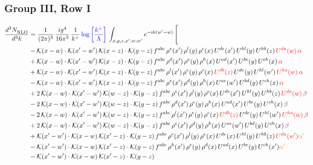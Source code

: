 \documentclass[9pt]{article}
\numberwithin{equation}{section}
\begin{document}
\subsubsection{Group III, Row I}
\begin{align}
     \frac{d^{3}N_{\rm NLO}^{\rm}}{d^{3}k}  & = \frac{1}{(2\pi)^{3}}\, \frac{ig^{4}}{16\pi^{5}}\, \frac{1}{k^{+}}\, {\color{blue}\log{\left[\frac{k^{+}}{\Lambda}\right]}}\, \int_{x,y,z,x^{\prime},w,w^{\prime}}e^{-ik(w^{\prime}-w)}\, \Bigg[\notag \\ & -\mathcal{K}(x-w)\cdot \mathcal{K}(x'-w')\, \mathcal{K}(x-z)\cdot \mathcal{K}(y-z)\, f^{abc}\, \rho^{e}(x')\,\rho^{l}(y)\,\rho^{c}(x)\,U^{de}(x')\,U^{hl}(y)\,U^{hb}(z)\,{\color{red}U^{da}(w)}\, {\color{red}\alpha} \notag \\ & +\mathcal{K}(x-w)\cdot \mathcal{K}(x'-w')\, \mathcal{K}(x-z)\cdot \mathcal{K}(y-z)\, f^{abc}\, \rho^{d}(x')\,\rho^{e}(y)\,\rho^{h}(x)\,U^{ad}(x')\,U^{be}(y)\,U^{ch}(x)\, {\color{red}\alpha} \notag \\ & + \mathcal{K}(x-w)\cdot \mathcal{K}(x'-w')\, \mathcal{K}(x-z)\cdot \mathcal{K}(y-z)\, f^{abc}\, \rho^{l}(x')\,\rho^{e}(y)\,\rho^{c}(x)\,{\color{red}U^{db}(z)}\,U^{de}(y)\,U^{hl}(w')\,{\color{red}U^{ha}(w)}\, {\color{red}\alpha} \notag \\ & -\mathcal{K}(x-w)\cdot \mathcal{K}(x'-w')\, \mathcal{K}(x-z)\cdot \mathcal{K}(y-z)\, f^{abc}\, \rho^{e}(x')\,\rho^{d}(y)\,\rho^{h}(x)\,U^{ae}(w')\,U^{bd}(y)\,U^{ch}(x)\, {\color{red}\alpha} \notag \\ & +2\, \mathcal{K}(x-w)\cdot \mathcal{K}(x'-w')\, \mathcal{K}(w-z) \cdot \mathcal{K}(y-z)\, f^{abc}\, \rho^{e}(x')\,\rho^{l}(y)\, \rho^{c}(x)\, U^{de}(x')\,U^{hl}(y)\,U^{hb}(z)\,{\color{red}U^{da}(w)}\, {\color{violet} \beta} \notag \\ & -2\, \mathcal{K}(x-w)\cdot \mathcal{K}(x'-w')\, \mathcal{K}(w-z) \cdot \mathcal{K}(y-z)\, f^{abc}\, \rho^{d}(x')\,\rho^{e}(y)\, \rho^{h}(x)\, U^{ad}(x')\,U^{be}(y)\,U^{ch}(x)\, {\color{violet} \beta}\notag \\ & -2\, \mathcal{K}(x-w)\cdot \mathcal{K}(x'-w')\, \mathcal{K}(w-z) \cdot \mathcal{K}(y-z)\, f^{abc}\, \rho^{l}(x')\,\rho^{e}(y)\, \rho^{c}(x)\, {\color{red}U^{db}(z)}\,U^{de}(y)\,U^{hl}(w')\,{\color{red}U^{ha}(w)}\, {\color{violet} \beta}\notag \\ & + 2\, \mathcal{K}(x-w)\cdot \mathcal{K}(x'-w')\, \mathcal{K}(w-z) \cdot \mathcal{K}(y-z)\, f^{abc}\, \rho^{e}(x')\,\rho^{d}(y)\, \rho^{h}(x)\, U^{ae}(w')\,U^{bd}(y)\,U^{ch}(x)\, {\color{violet} \beta}\notag \\ & +\mathcal{K}(x'-w')\cdot\mathcal{K}(x-w)\,\mathcal{K}(x'-z)\cdot\mathcal{K}(y-z)\, f^{abc}\,\rho^{c}(x')\,\rho^{l}(y)\,\rho^{e}(x)\,U^{de}(x)\,U^{hl}(y)\,U^{hb}(z)\,{\color{red}U^{da}(w')}{\color{orange} \alpha'}\notag\\ &-\mathcal{K}(x'-w')\cdot\mathcal{K}(x-w)\,\mathcal{K}(x'-z)\cdot\mathcal{K}(y-z)\, f^{abc}\,\rho^{h}(x')\,\rho^{e}(y)\,\rho^{d}(x)\,U^{ad}(x)\,U^{be}(y)\,U^{ch}(x'){\color{orange} \alpha'}\notag\\ &-\mathcal{K}(x'-w')\cdot\mathcal{K}(x-w)\,\mathcal{K}(x'-z)\cdot\mathcal{K}(y-z)\, 
\end{align}
\end{document}
